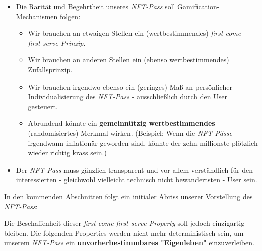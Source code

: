 \begin{itemize}
  \item Die Rarität und Begehrtheit unseres \textit{NFT-Pass} soll Gamification-Mechanismen folgen:
  \begin{itemize}
    \item Wir brauchen an etwaigen Stellen ein (wertbestimmendes) \textit{first-come-first-serve-Prinzip}.
    \item Wir brauchen an anderen Stellen ein (ebenso wertbestimmendes) Zufallsprinzip.
    \item Wir brauchen irgendwo ebenso ein (geringes) Maß an persönlicher Individua\-lisierung des \textit{NFT-Pass} - ausschließlich durch den User gesteuert.
    \item Abrundend könnte ein \textbf{gemeinnützig wertbestimmendes} (randomisiertes) Merkmal wirken. (Beispiel: Wenn die \textit{NFT-Pässe} irgendwann inflationär geworden sind, könnte der zehn-millionste plötzlich wieder richtig krass sein.)
  \end{itemize}
  \item Der \textit{NFT-Pass} muss gänzlich transparent und vor allem verständlich für den interessierten - gleichwohl vielleicht technisch nicht bewandertsten - User sein.
\end{itemize}

\vspace{0.3cm}

In den kommenden Abschnitten folgt ein initialer Abriss unserer Vorstellung des \textit{NFT-Pass}:

\vspace{0.3cm}



Die Beschaffenheit dieser \textit{first-come-first-serve-Property} soll jedoch einzigartig bleiben. Die folgenden Properties werden nicht mehr deterministisch sein, um unserem \textit{NFT-Pass} ein \textbf{unvorherbestimmbares "Eigenleben"} einzuverleiben. 




%

 



\vspace{0.5cm}




